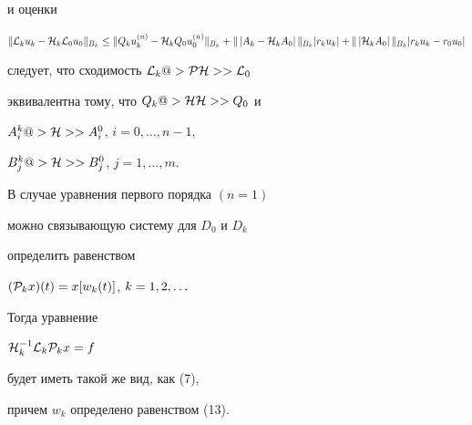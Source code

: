 и оценки


$\|{\cal L}_k u_k-{\cal H}_k{\cal L}_0 u_0\|_{B_k} \leq


\|Q_k u^{(n)}_k-{\cal H}_k Q_0u^{(n)}_0\|_{B_k} +


\|\,|A_k-{\cal H}_k A_0|\,\|_{B_k}


|r_ku_k| +\|\,|{\cal H}_k A_0|\,\|_{B_k} |r_ku_k-r_0u_0|$


следует, что сходимость ${\cal L}_k@>{{\cal P}{\cal H}}>>{\cal L}_0$


эквивалентна тому, что $Q_k@>{{\cal H}{\cal H}}>> Q_0$ и


$A^k_i@>{\cal H}>> A^0_i$, $i=0,\dotsc,n-1$,


$B_j^k@>{\cal H}>> B_j^0$, $j=1,\dotsc,m$.





\begin{note}


В случае уравнения первого порядка $(n=1)$


можно связывающую систему для $D_0$ и $D_k$


определить равенством


$({\cal P}_k x)(t)=x[w_k(t)]$, $k=1,2,\dotsc$


Тогда уравнение


${\cal H}_k^{-1} {\cal L}_k{\cal P}_k x= f$


будет иметь такой же вид, как (7),


причем $w_k$ определено равенством (13).


\end{note}





